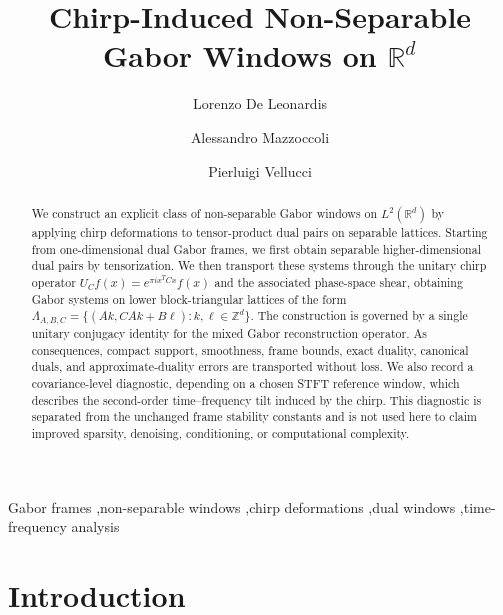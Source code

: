 \documentclass[final,1p,times,authoryear]{elsarticle}
\theoremstyle{definition}
\newcommand{\R}{\mathbb{R}}
\newcommand{\Z}{\mathbb{Z}}
\newcommand{\1}{\mathbf{1}}
\begin{document}
\begin{frontmatter}


\title{Chirp-Induced Non-Separable Gabor Windows on $\mathbb{R}^d$}

 \author[label1]{Lorenzo De Leonardis}


\author[label2]{Alessandro Mazzoccoli}
\author[label2]{Pierluigi Vellucci}


\begin{abstract}
We construct an explicit class of non-separable Gabor windows on $L^2(\R^d)$ by applying chirp deformations to tensor-product dual pairs on separable lattices. Starting from one-dimensional dual Gabor frames, we first obtain separable higher-dimensional dual pairs by tensorization. We then transport these systems through the unitary chirp operator $U_C f(x)=e^{\pi i x^T Cx}f(x)$ and the associated phase-space shear, obtaining Gabor systems on lower block-triangular lattices of the form
$
\Lambda_{A,B,C}=\{(Ak,CAk+B\ell):k,\ell\in\Z^d\}.
$
{The construction is governed by a single unitary conjugacy identity for the mixed Gabor
reconstruction operator. As consequences, compact support, smoothness, frame bounds,
exact duality, canonical duals, and approximate-duality errors are transported without loss.} {We also record a covariance-level diagnostic, depending on a chosen STFT reference window,
which describes the second-order time--frequency tilt induced by the chirp. This diagnostic is
separated from the unchanged frame stability constants and is not used here to claim improved
sparsity, denoising, conditioning, or computational complexity.}
\end{abstract}


\begin{keyword}
Gabor frames \sep non-separable windows \sep chirp deformations \sep dual windows \sep time-frequency analysis
\end{keyword}


\end{frontmatter}


\section{Introduction}
\end{document}

